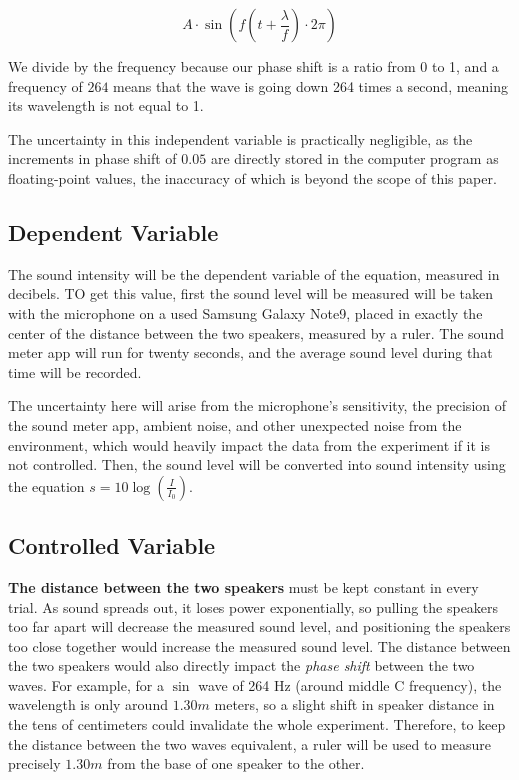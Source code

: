\documentclass[index]{subfiles}
\begin{document}
\begin{equation*}
    A\cdot\sin\left(f\left(t+\frac{\lambda}{f}\right)\cdot2\pi\right)
\end{equation*}

We divide by the frequency because our phase shift is a ratio from 0 to 1, and a frequency of \(264\) means that the wave is going down 264 times a second, meaning its wavelength is not equal to 1.

The uncertainty in this independent variable is practically negligible, as the increments in phase shift of \(0.05\) are directly stored in the computer program as floating-point values, the inaccuracy of which is beyond the scope of this paper.

\subsection{Dependent Variable}

The sound intensity will be the dependent variable of the equation, measured in decibels. TO get this value, first the sound level will be measured will be taken with the microphone on a used Samsung Galaxy Note9, placed in exactly the center of the distance between the two speakers, measured by a ruler. The sound meter app will run for twenty seconds, and the average sound level during that time will be recorded.

The uncertainty here will arise from the microphone's sensitivity, the precision of the sound meter app, ambient noise, and other unexpected noise from the environment, which would heavily impact the data from the experiment if it is not controlled. Then, the sound level will be converted into sound intensity using the equation \(s=10\log(\frac{I}{I_0})\).

\subsection{Controlled Variable}

\textbf{The distance between the two speakers} must be kept constant in every trial. As sound spreads out, it loses power exponentially, so pulling the speakers too far apart will decrease the measured sound level, and positioning the speakers too close together would increase the measured sound level. The distance between the two speakers would also directly impact the \textit{phase shift} between the two waves. For example, for a \(\sin\) wave of 264 Hz (around middle C frequency), the wavelength is only around \(1.30m\) meters, so a slight shift in speaker distance in the tens of centimeters could invalidate the whole experiment. Therefore, to keep the distance between the two waves equivalent, a ruler will be used to measure precisely \(1.30m\) from the base of one speaker to the other.
\end{document}
